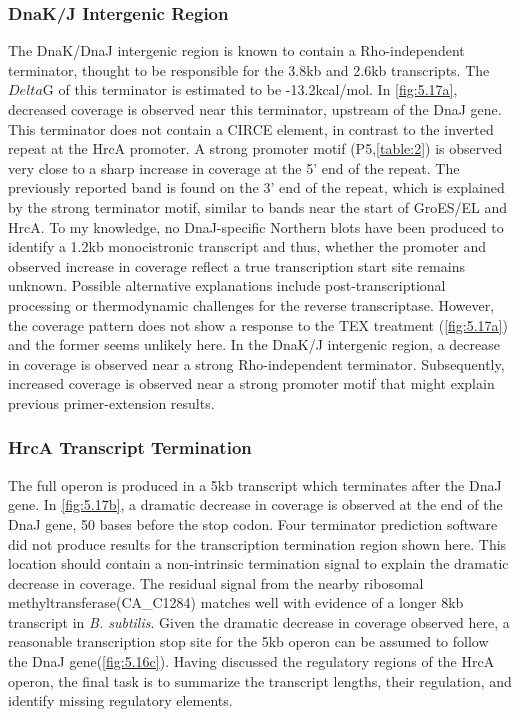 \subsubsection{DnaK/J Intergenic Region}
The DnaK/DnaJ intergenic region is known to contain a Rho-independent terminator\cite{80,81}, thought to be responsible for the 3.8kb and 2.6kb transcripts. The \(Delta\)G of this terminator is estimated to be -13.2kcal/mol. In \ref{fig:5.17a}, decreased coverage is observed near this terminator, upstream of the DnaJ gene. This terminator does not contain a CIRCE element, in contrast to the inverted repeat at the HrcA promoter. A strong promoter motif (P5,\ref{table:2}) is observed very close to a sharp increase in coverage at the 5' end of the repeat. The previously reported band is found on the 3' end of the repeat, which is explained by the strong terminator motif, similar to bands near the start of GroES/EL and HrcA. To my knowledge, no DnaJ-specific Northern blots have been produced to identify a 1.2kb monocistronic transcript and thus, whether the promoter and observed increase in coverage reflect a true transcription start site remains unknown. Possible alternative explanations include post-transcriptional processing or thermodynamic challenges for the reverse transcriptase\cite{80}. However, the coverage pattern does not show a response to the TEX treatment (\ref{fig:5.17a}) and the former seems unlikely here. In the DnaK/J intergenic region, a decrease in coverage is observed near a strong Rho-independent terminator. Subsequently, increased coverage is observed near a strong promoter motif that might explain previous primer-extension results\cite{80}.


\subsubsection{HrcA Transcript Termination}
The full operon is produced in a 5kb transcript which terminates after the DnaJ gene. In \ref{fig:5.17b}, a dramatic decrease in coverage is observed at the end of the DnaJ gene, 50 bases before the stop codon. Four terminator prediction software did not produce results for the transcription termination region shown here. This location should contain a non-intrinsic termination signal to explain the dramatic decrease in coverage. The residual signal from the nearby ribosomal methyltransferase(CA_C1284) matches well with evidence of a longer 8kb transcript in \textit{B. subtilis}\cite{81}. Given the dramatic decrease in coverage observed here, a reasonable transcription stop site for the 5kb operon can be assumed to follow the DnaJ gene(\ref{fig:5.16c}). Having discussed the regulatory regions of the HrcA operon, the final task is to summarize the transcript lengths, their regulation, and identify missing regulatory elements.


